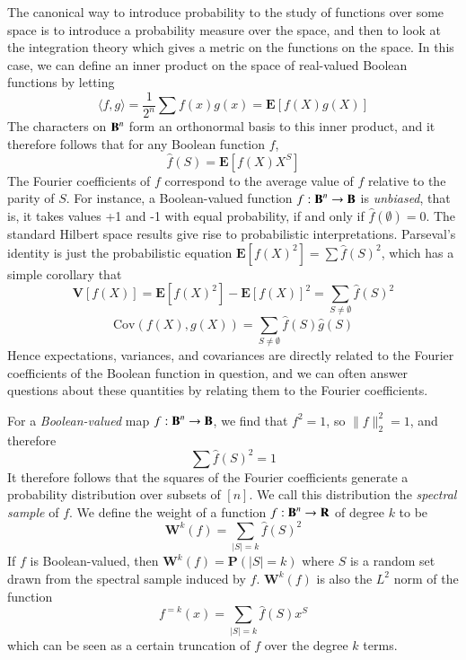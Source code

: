 The canonical way to introduce probability to the study of functions over some space is to introduce a probability measure over the space, and then to look at the integration theory which gives a metric on the functions on the space. In this case, we can define an inner product on the space of real-valued Boolean functions by letting
%
\[ \langle f, g \rangle = \frac{1}{2^n} \sum f(x)g(x) = \mathbf{E}[f(X)g(X)] \]
%
The characters on $\operatorname{\mathbf{B}}^n$ form an orthonormal basis to this inner product, and it therefore follows that for any Boolean function $f$,
%
\[ \widehat{f}(S) = \mathbf{E}[f(X)X^S] \]
%
The Fourier coefficients of $f$ correspond to the average value of $f$ relative to the parity of $S$. For instance, a Boolean-valued function $f: \operatorname{\mathbf{B}}^n \to \operatorname{\mathbf{B}}$ is {\it unbiased}, that is, it takes values +1 and -1 with equal probability, if and only if $\widehat{f}(\emptyset) = 0$. The standard Hilbert space results give rise to probabilistic interpretations. Parseval's identity is just the probabilistic equation $\mathbf{E}[f(X)^2] = \sum \widehat{f}(S)^2$, which has a simple corollary that
%
\[ \mathbf{V}[f(X)] = \mathbf{E}[f(X)^2] - \mathbf{E}[f(X)]^2 = \sum_{S \neq \emptyset} \widehat{f}(S)^2 \]
%
\[ \text{Cov}(f(X),g(X)) = \sum_{S \neq \emptyset} \widehat{f}(S) \widehat{g}(S) \]
%
Hence expectations, variances, and covariances are directly related to the Fourier coefficients of the Boolean function in question, and we can often answer questions about these quantities by relating them to the Fourier coefficients.

For a {\it Boolean-valued} map $f: \operatorname{\mathbf{B}}^n \to \operatorname{\mathbf{B}}$, we find that $f^2 = 1$, so $\| f \|_2^2 = 1$, and therefore
%
\[ \sum \widehat{f}(S)^2 = 1 \]
%
It therefore follows that the squares of the Fourier coefficients generate a probability distribution over subsets of $[n]$. We call this distribution the \emph{spectral sample} of $f$. We define the weight of a function $f: \operatorname{\mathbf{B}}^n \to \mathbf{R}$ of degree $k$ to be
%
\[ \mathbf{W}^k(f) = \sum_{|S| = k} \widehat{f}(S)^2 \]
%
If $f$ is Boolean-valued, then $\mathbf{W}^k(f) = \mathbf{P}(|S| = k)$ where $S$ is a random set drawn from the spectral sample induced by $f$. $\mathbf{W}^k(f)$ is also the $L^2$ norm of the function
%
\[ f^{=k}(x) = \sum_{|S| = k} \widehat{f}(S) x^S \]
%
which can be seen as a certain truncation of $f$ over the degree $k$ terms.

